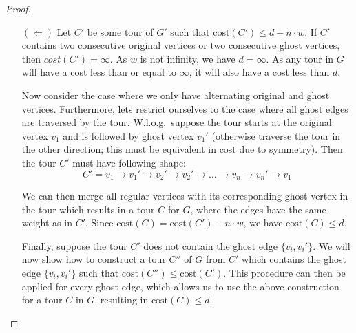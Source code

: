 \documentclass{article}
\begin{document}
\begin{proof}
\begin{itemize}
        \item [$(\Leftarrow)$] Let $C'$ be some tour of $G'$ such that $\text{cost}(C') \le d + n \cdot w$. If $C'$ contains two consecutive original vertices or two consecutive ghost vertices, then $cost(C') = \infty$. As $w$ is not infinity, we have $d = \infty$. As any tour in $G$ will have a cost less than or equal to $\infty$, it will also have a cost less than $d$. 
        
        Now consider the case where we only have alternating original and ghost vertices. Furthermore, lets restrict ourselves to the case where all ghost edges are traversed by the tour. W.l.o.g.~suppose the tour starts at the original vertex $v_1$ and is followed by ghost vertex $v_1'$ (otherwise traverse the tour in the other direction; this must be equivalent in cost due to symmetry). Then the tour $C'$ must have following shape:
        \[
            C' = v_1 \rightarrow v_1' \rightarrow v_2'\rightarrow v_2' \rightarrow \dots \rightarrow v_n \rightarrow v_n' \rightarrow v_1
        \]
        
        We can then merge all regular vertices with its corresponding ghost vertex in the tour which results in a tour $C$ for $G$, where the edges have the same weight as in $C'$. Since $\text{cost}(C) = \text{cost}(C') - n \cdot w$, we have $\text{cost}(C) \le d$.

        Finally, suppose the tour $C'$ does not contain the ghost edge $\{v_i, v_i'\}$. We will now show how to construct a tour $C''$ of $G$ from $C'$ which contains the ghost edge $\{v_i, v_i'\}$ such that $\text{cost}(C'') \le \text{cost}(C')$. This procedure can then be applied for every ghost edge, which allows us to use the above construction for a tour $C$ in $G$, resulting in $\text{cost}(C) \le d$.


\end{itemize}
\end{proof}
\end{document}
